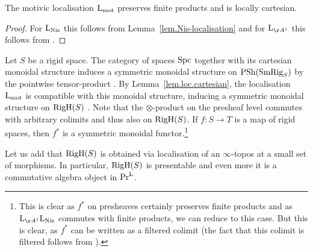 \documentclass[colorinlistoftodos,article,11pt,reqno]{article}
\newcommand{\RigH}{\textup{RigH}}
\newcommand{\SmRig}{\textup{SmRig}}
\newcommand{\Spc}{\textup{Spc}}
\newcommand{\PSh}{\textup{PSh}}
\newcommand{\Nis}{\textup{Nis}}
\newcommand{\Arig}{\AA^{1}}
\renewcommand{\to}[1][]{\overset{#1}{\rightarrow}}
\renewcommand{\L}{\textup{L}}
\newcommand{\Lmot}{\L_{\textup{mot}}}
\newcommand{\PrL}{\textup{Pr}^{\textup{L}}}
\begin{document}
\begin{lem}
\label{lem.loc.cartesian}
	The motivic localisation $\Lmot$ preserves finite products and is locally cartesian.
\end{lem}
\begin{proof}
	For $\L_{\Nis}$ this follows from Lemma~\ref{lem.Nis-localisation} and for $\L_{\Arig}$ this follows from \cite[Prop. 3.4]{Hoy-EQ}.
\end{proof}

\begin{rem}[Monoidal structure on $\RigH$]
\label{rem-RigH-monoidal}
	Let $S$ be a rigid space. The category of spaces $\Spc$ together with its cartesian monoidal structure induces a symmetric monoidal structure on $\PSh(\SmRig_S)$ by the pointwise tensor-product \cite[Rem. 2.1.3.4]{HA}. By Lemma~\ref{lem.loc.cartesian}, the localisation $\Lmot$ is compatible with this monoidal structure, inducing a  symmetric monoidal structure on $\RigH(S)$ \cite[Prop. 2.2.1.9]{HA}. Note that the $\otimes$-product on the presheaf level commutes with arbitrary colimits and thus also on $\RigH(S)$. 
	If $f\colon S\to T$ is a map of rigid spaces, then $f^{*}$ is a symmetric monoidal functor.\footnote{This is clear as $f^{*}$ on presheaves certainly preserves finite products and as $\L_{\Arig}\L_{\Nis}$ commutes with finite products, we can reduce to this case. But this is clear, as $f^{*}$ can be written as a filtered colimit (the fact that this colimit is filtered follows from \cite[00X3]{stacks-project}).}

    Let us add that $\RigH(S)$ is obtained via localisation of an $\infty$-topos at a small set of morphisms. In particular, $\RigH(S)$ is presentable and even more it is a commutative algebra object in $\PrL$.
\end{rem}
\end{document}
